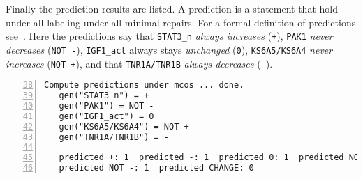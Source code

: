 \documentclass{article}
\begin{document}
Finally the prediction results are listed.
A prediction is a statement that hold under all labeling under all minimal repairs. 
For a formal definition of predictions see~\cite{sthiele15}.
Here the predictions say that 
\texttt{STAT3\_n} \emph{always increases} (\texttt{+}),
\texttt{PAK1} \emph{never decreases} (\texttt{NOT -}),
\texttt{IGF1\_act} always stays \emph{unchanged} (\texttt{0}),
\texttt{KS6A5/KS6A4} \emph{never increases} (\texttt{NOT +}), and that
\texttt{TNR1A/TNR1B} \emph{always decreases} (\texttt{-}).

\begin{Verbatim}[frame=single,numbers=left,firstnumber=38]  
Compute predictions under mcos ... done.
   gen("STAT3_n") = +
   gen("PAK1") = NOT -
   gen("IGF1_act") = 0
   gen("KS6A5/KS6A4") = NOT +
   gen("TNR1A/TNR1B") = -
 
   predicted +: 1  predicted -: 1  predicted 0: 1  predicted NOT +: 1  
   predicted NOT -: 1  predicted CHANGE: 0
\end{Verbatim}  


 
 
\end{document}
